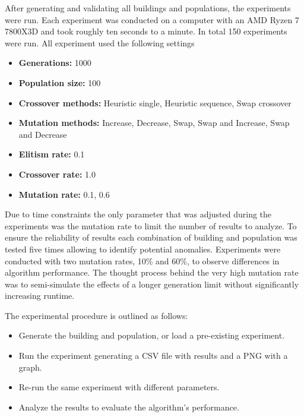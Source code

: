 After generating and validating all buildings and populations, the experiments were run. Each experiment was conducted on a computer with an AMD Ryzen 7 7800X3D and took roughly ten seconds to a minute. In total 150 experiments were run.
\newpage
All experiment used the following settings 

\begin{itemize}
    \item \textbf{Generations:} 1000
    \item \textbf{Population size:} 100
    \item \textbf{Crossover methods:} Heuristic single, Heuristic sequence, Swap crossover
    \item \textbf{Mutation methods:} Increase, Decrease, Swap, Swap and Increase, Swap and Decrease
    \item \textbf{Elitism rate:} 0.1
    \item \textbf{Crossover rate:} 1.0
    \item \textbf{Mutation rate:} 0.1, 0.6
\end{itemize}


Due to time constraints the only parameter that was adjusted during the experiments was the mutation rate to limit the number of results to analyze.
To ensure the reliability of results each combination of building and population was tested five times allowing to identify potential anomalies. Experiments were conducted with two mutation rates, 10\% and 60\%, to observe differences in algorithm performance.
The thought process behind the very high mutation rate was to semi-simulate the effects of a longer generation limit without significantly increasing runtime.

The experimental procedure is outlined as follows:

\begin{itemize}
	\item Generate the building and population, or load a pre-existing experiment.
	\item Run the experiment generating a CSV file with results and a PNG with a graph.
	\item Re-run the same experiment with different parameters.
	\item Analyze the results to evaluate the algorithm's performance.
\end{itemize}
